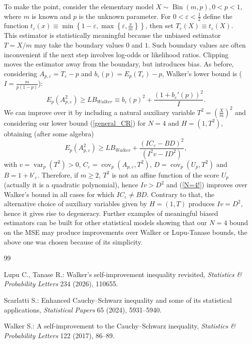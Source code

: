 \documentclass[11pt]{article}
\begin{document}
To make the point, consider the elementary model $ X\sim \operatorname{Bin}(m,p),0<p<1,$ where $m$ is known and $p$ is the unknown parameter. For $0<\varepsilon<\frac1{2}$ define the function $t_\varepsilon(x)\equiv \min\left\{1-\varepsilon,\max\left\{\varepsilon,\frac{x}{m}\right\}\right\}$,
then set $T_\varepsilon(X)\equiv t_\varepsilon(X)$. This estimator is statistically meaningful because the unbiased estimator
$T=X/m$ may take the boundary values $0$ and $1$. Such boundary values are often inconvenient if the next step involves log-odds or likelihood ratios. Clipping moves the estimator away from the boundary, but introduces bias. As before, considering $A_{p,\varepsilon}=T_{\varepsilon}-p$ and $b_{\varepsilon}(p)=E_p(T_{\varepsilon})-p$, Walker's lower bound is ($I=\frac{m}{p(1-p)}$):
$$
E_p(A_{p,\varepsilon}^2)
\geq
LB_{Walker}\equiv b_\varepsilon(p)^2
+
\frac{(1+b_\varepsilon'(p))^2}{I}.
$$
We can improve over it by including a natural auxiliary variable $T^2=(\frac{X}{m})^2$ and considering our lower bound (\ref{general_CR}) for $N=4$ and $H=(1,T^2)$, obtaining (after some algebra)
\begin{equation}\label{N=4!}
E_p(A_{p,\varepsilon}^2)\geq LB_{Walker}+
\frac{(I C_\varepsilon-BD)^2}{(I^2v-ID^2)},
\end{equation}
with $v=\operatorname{var}_p(T^2)>0$, $C_{\varepsilon}=\operatorname{cov}_p(A_{p,\varepsilon},T^2)$, $D=\operatorname{cov}_p(U_{p},T^2)$ and $B=1+b'_{\varepsilon}$. Therefore, if $m\geq 2$, $T^2$ is not an affine function of the score $U_p$ (actually it is a quadratic polynomial),  hence $Iv>D^2$ and (\ref{N=4!}) improves over Walker's bound in all cases for which $I C_\varepsilon\neq BD$. Contrary to that, the alternative choice of auxiliary variables given by $H=(1,T)$ produces $Iv=D^2$,  hence it gives rise to degeneracy. Further examples of meaningful biased estimators can be built  for other statistical models showing that our $N=4$ bound on the MSE may produce improvements over Walker or Lupu-Tanase bounds, the above one was chosen because of its simplicity.

\begin{thebibliography}{99}

Lupu C., Tanase R.:
Walker’s self-improvement inequality revisited,
\emph{Statistics \& Probability Letters} 234 (2026), 110655.

Scarlatti S.:
Enhanced Cauchy--Schwarz inequality and some of its statistical applications,
\emph{Statistical Papers} 65 (2024), 5931--5940.

Walker S.:
A self-improvement to the Cauchy--Schwarz inequality,
\emph{Statistics \& Probability Letters} 122 (2017), 86--89.

\end{thebibliography}
\end{document}
